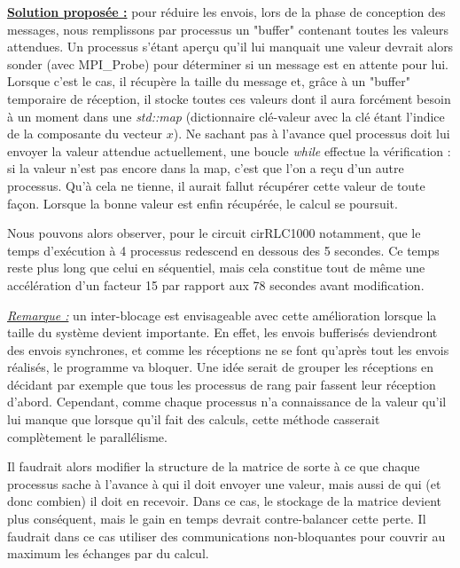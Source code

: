 \documentclass[11pt,a4paper,oneside]{memoir}
\theoremstyle{definition}
\theoremstyle{remark}
\theoremstyle{plain}
\begin{document}
\textbf{\underline{Solution proposée :}} pour réduire les envois, lors de la phase de conception des messages, nous remplissons par processus un "buffer" contenant toutes les valeurs attendues. Un processus s'étant aperçu qu'il lui manquait une valeur devrait alors sonder (avec MPI\_Probe) pour déterminer si un message est en attente pour lui. Lorsque c'est le cas, il récupère la taille du message et, grâce à un "buffer" temporaire de réception, il stocke toutes ces valeurs dont il aura forcément besoin à un moment dans une \textit{std::map} (dictionnaire clé-valeur avec la clé étant l'indice de la composante du vecteur $x$). Ne sachant pas à l'avance quel processus doit lui envoyer la valeur attendue actuellement, une boucle \textit{while} effectue la vérification : si la valeur n'est pas encore dans la map, c'est que l'on a reçu d'un autre processus. Qu'à cela ne tienne, il aurait fallut récupérer cette valeur de toute façon. Lorsque la bonne valeur est enfin récupérée, le calcul se poursuit.

Nous pouvons alors observer, pour le circuit cirRLC1000 notamment, que le temps d'exécution à 4 processus redescend en dessous des 5 secondes. Ce temps reste plus long que celui en séquentiel, mais cela constitue tout de même une accélération d'un facteur 15 par rapport aux 78 secondes avant modification.

\textit{\underline{Remarque :}} un inter-blocage est envisageable avec cette amélioration lorsque la taille du système devient importante. En effet, les envois bufferisés deviendront des envois synchrones, et comme les réceptions ne se font qu'après tout les envois réalisés, le programme va bloquer. Une idée serait de grouper les réceptions en décidant par exemple que tous les processus de rang pair fassent leur réception d'abord. Cependant, comme chaque processus n'a connaissance de la valeur qu'il lui manque que lorsque qu'il fait des calculs, cette méthode casserait complètement le parallélisme.

Il faudrait alors modifier la structure de la matrice de sorte à ce que chaque processus sache à l'avance à qui il doit envoyer une valeur, mais aussi de qui (et donc combien) il doit en recevoir. Dans ce cas, le stockage de la matrice devient plus conséquent, mais le gain en temps devrait contre-balancer cette perte. Il faudrait dans ce cas utiliser des communications non-bloquantes pour couvrir au maximum les échanges par du calcul.\bigskip
\end{document}
